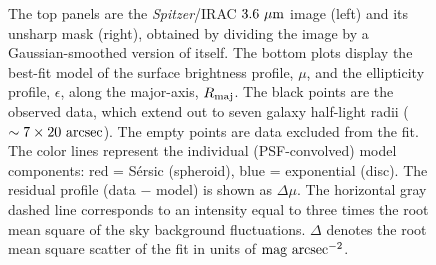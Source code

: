 \documentclass[useAMS,usenatbib,article]{mn2e}
\begin{document}
\begin{figure}
\begin{center}
{The top panels are the \emph{Spitzer}/IRAC $3.6~\rm \mu m$ image (left) and its unsharp mask (right), 
obtained by dividing the image by a Gaussian-smoothed version of itself. 
The bottom plots display the best-fit model of the surface brightness profile, $\mu$, 
and the ellipticity profile, $\epsilon$, 
along the major-axis, $R_{\rm maj}$. 
The black points are the observed data, which extend out to seven galaxy half-light radii ($\sim 7 \times 20~\rm arcsec$). 
The empty points are data excluded from the fit.   
The color lines represent the individual (PSF-convolved) model components: 
red = S\'ersic (spheroid), blue = exponential (disc). 
The residual profile (data $-$ model) is shown as $\Delta \mu$. 
The horizontal gray dashed line corresponds to an intensity equal to three times the root mean square of the sky background fluctuations. 
$\Delta$ denotes the root mean square scatter of the fit in units of $\rm mag~arcsec^{-2}$.
}
\label{fig:n1332}
\end{center}
\end{figure}
\end{document}
